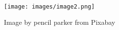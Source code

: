 \begin{figure}[h]
    \centering
    \texttt{[image: images/image2.png]}
    \caption{Image by pencil parker from Pixabay}
    \label{fig:figure2}
\end{figure}